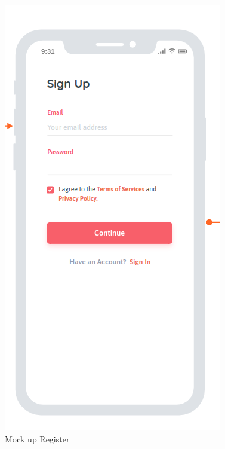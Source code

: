     \begin{figure}[h!]
        \includegraphics[width=\linewidth]{./graphics/register_Mockup.png}
        \caption{Mock up Register}
        \label{fig:registerMockup}
    \end{figure}
    
